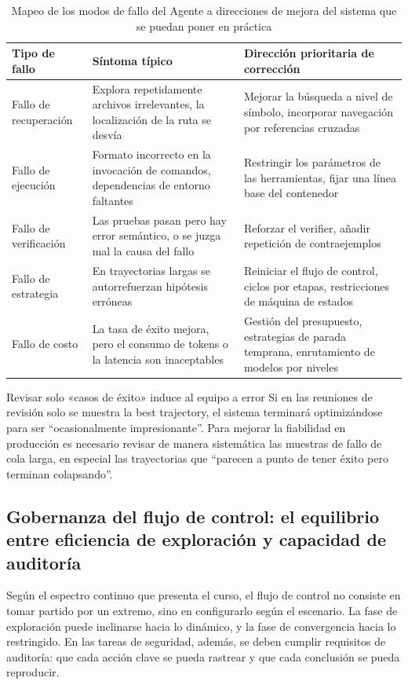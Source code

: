 \documentclass[a4paper]{article}
\begin{document}
\begin{table}[H]
\centering
\begin{tabular}{p{3.2cm}p{4.6cm}p{4.6cm}}
\toprule
\textbf{Tipo de fallo} & \textbf{Síntoma típico} & \textbf{Dirección prioritaria de corrección} \\
\midrule
Fallo de recuperación & Explora repetidamente archivos irrelevantes, la localización de la ruta se desvía & Mejorar la búsqueda a nivel de símbolo, incorporar navegación por referencias cruzadas \\
Fallo de ejecución & Formato incorrecto en la invocación de comandos, dependencias de entorno faltantes & Restringir los parámetros de las herramientas, fijar una línea base del contenedor \\
Fallo de verificación & Las pruebas pasan pero hay error semántico, o se juzga mal la causa del fallo & Reforzar el verifier, añadir repetición de contraejemplos \\
Fallo de estrategia & En trayectorias largas se autorrefuerzan hipótesis erróneas & Reiniciar el flujo de control, ciclos por etapas, restricciones de máquina de estados \\
Fallo de costo & La tasa de éxito mejora, pero el consumo de tokens o la latencia son inaceptables & Gestión del presupuesto, estrategias de parada temprana, enrutamiento de modelos por niveles \\
\bottomrule
\end{tabular}
\caption{Mapeo de los modos de fallo del Agente a direcciones de mejora del sistema que se puedan poner en práctica}
\end{table}

\begin{warningbox}{Revisar solo «casos de éxito» induce al equipo a error}
Si en las reuniones de revisión solo se muestra la best trajectory, el sistema terminará optimizándose para ser ``ocasionalmente impresionante''. Para mejorar la fiabilidad en producción es necesario revisar de manera sistemática las muestras de fallo de cola larga, en especial las trayectorias que ``parecen a punto de tener éxito pero terminan colapsando''.
\end{warningbox}

\subsection{Gobernanza del flujo de control: el equilibrio entre eficiencia de exploración y capacidad de auditoría}
Según el espectro continuo que presenta el curso, el flujo de control no consiste en tomar partido por un extremo, sino en configurarlo según el escenario. La fase de exploración puede inclinarse hacia lo dinámico, y la fase de convergencia hacia lo restringido. En las tareas de seguridad, además, se deben cumplir requisitos de auditoría: que cada acción clave se pueda rastrear y que cada conclusión se pueda reproducir.
\end{document}
